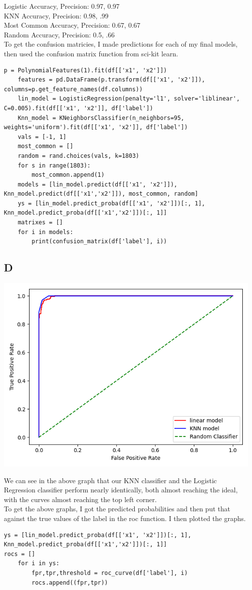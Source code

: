 \documentclass[11pt]{article} %
\begin{document}
Logistic Accuracy, Precision: 0.97, 0.97\\
KNN Accuracy, Precision: 0.98, .99\\
Most Common Accuracy, Precision: 0.67, 0.67\\
Random Accuracy, Precision: 0.5, .66 \\
To get the confusion matricies, I made predictions for each of my final  models, then used the confusion matrix function from sci-kit learn. \begin{verbatim}
p = PolynomialFeatures(1).fit(df[['x1', 'x2']])
    features = pd.DataFrame(p.transform(df[['x1', 'x2']]), columns=p.get_feature_names(df.columns))
    lin_model = LogisticRegression(penalty='l1', solver='liblinear', C=0.005).fit(df[['x1', 'x2']], df['label'])
    Knn_model = KNeighborsClassifier(n_neighbors=95, weights='uniform').fit(df[['x1', 'x2']], df['label'])
    vals = [-1, 1]
    most_common = []
    random = rand.choices(vals, k=1803)
    for s in range(1803):
        most_common.append(1)
    models = [lin_model.predict(df[['x1', 'x2']]), Knn_model.predict(df[['x1','x2']]), most_common, random]
    ys = [lin_model.predict_proba(df[['x1', 'x2']])[:, 1], Knn_model.predict_proba(df[['x1','x2']])[:, 1]]
    matrixes = []
    for i in models:
        print(confusion_matrix(df['label'], i))
\end{verbatim}
\subsection{D}
\begin{center}
\includegraphics[scale=0.5]{roc2.png}
\end{center}
We can see in the above graph that our KNN classifier and the Logistic Regression classifier perform nearly identically, both almost reaching the ideal, with the curves almost reaching the top left corner. \\ To get the above graphs, I got the predicted probabilities and then put that against the true values of the label in the roc function. I then plotted the graphs. \begin{verbatim}
ys = [lin_model.predict_proba(df[['x1', 'x2']])[:, 1], Knn_model.predict_proba(df[['x1','x2']])[:, 1]]
rocs = []
    for i in ys:
        fpr,tpr,threshold = roc_curve(df['label'], i)
        rocs.append((fpr,tpr))
\end{verbatim}
\end{document}

